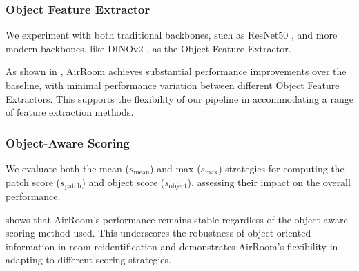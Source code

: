 \subsubsection{Object Feature Extractor}

We experiment with both traditional backbones, such as ResNet50 \cite{he2015deepresiduallearningimage}, and more modern backbones, like DINOv2 \cite{oquab2024dinov2learningrobustvisual}, as the Object Feature Extractor.

As shown in , AirRoom achieves substantial performance improvements over the baseline, with minimal performance variation between different Object Feature Extractors. This supports the flexibility of our pipeline in accommodating a range of feature extraction methods.

\begin{table}[h]
\vspace{-6pt}
\centering
{}
\vspace{-10pt}
\caption{Object Feature Extractor Flexibility.}
\vspace{-20pt}
\label{tab:ofe flexibility}
\end{table}





\subsubsection{Object-Aware Scoring}

We evaluate both the mean (\(s_{\text{mean}}\)) and max (\(s_{\max}\)) strategies for computing the patch score (\(s_{\text{patch}}\)) and object score (\(s_{\text{object}}\)), assessing their impact on the overall performance.

 shows that AirRoom’s performance remains stable regardless of the object-aware scoring method used. This underscores the robustness of object-oriented information in room reidentification and demonstrates AirRoom’s flexibility in adapting to different scoring strategies.

